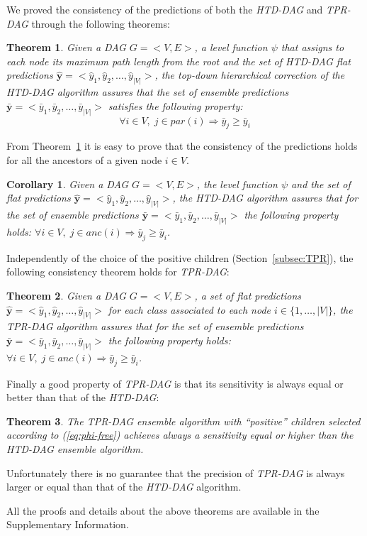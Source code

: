 \documentclass{bioinfo}
\newcommand{\by}{\boldsymbol{y}}
\newtheorem{theorem}{Theorem}
\newtheorem{corollary}{Corollary}
\begin{document}
\begin{methods}
We proved the consistency of the predictions of both the {\em HTD-DAG} and {\em TPR-DAG} through the following theorems:
\begin{theorem} 
Given a DAG $G = <V,E>$, a level function $\psi$ that assigns to each node its maximum path length from the root and the set of {\em HTD-DAG} flat predictions $\hat{\by} = < \hat{y}_1, \hat{y}_2, \ldots, \hat{y}_{|V|}>$, the top-down hierarchical correction of the {\em HTD-DAG} algorithm assures that the set of ensemble predictions $\bar{\by} =< \bar{y}_1, \bar{y}_2, \ldots, \bar{y}_{|V|}>$ satisfies the following property: 
\[
\forall i \in V, \;  j \in par(i) \Rightarrow \bar{y}_j \geq \bar{y}_i
\]
\label{th:htd}
\end{theorem}
From Theorem~\ref{th:htd} it is easy to prove that the consistency of the predictions holds for all the ancestors of a given node $i \in V$. 
\begin{corollary}\label{cor:hier-consistency} Given a DAG $G = <V,E>$, the level function $\psi$ and the set of flat predictions $\hat{\by} = < \hat{y}_1, \hat{y}_2, \ldots, \hat{y}_{|V|}>$,  the {\em HTD-DAG} algorithm assures that for the set of ensemble predictions $\bar{\by} = < \bar{y}_1, \bar{y}_2, \ldots, \bar{y}_{|V|}>$ the following property holds: $\forall i \in V, \;  j \in anc(i) \Rightarrow \bar{y}_j \geq \bar{y}_i$.
\end{corollary}
Independently of the choice of the positive children (Section~\ref{subsec:TPR}), the following consistency theorem holds for {\em TPR-DAG}:
\begin{theorem} Given a DAG $G = <V,E>$, a set of flat predictions $\hat{\by} = < \hat{y}_1, \hat{y}_2, \ldots, \hat{y}_{|V|}>$ for each class associated to each node $i \in \{1, \ldots, |V| \}$,  the {\em TPR-DAG} algorithm assures that for the set of ensemble predictions $\bar{\by} = < \bar{y}_1, \bar{y}_2, \ldots, \bar{y}_{|V|}>$ the following property holds: $\forall i \in V, \;  j \in anc(i) \Rightarrow \bar{y}_j \geq \bar{y}_i$.
\end{theorem}
Finally a good property of {\em TPR-DAG} is that its sensitivity is always equal or better than that of the {\em HTD-DAG}:
\begin{theorem}
The {\em TPR-DAG} ensemble algorithm with ``positive'' children selected according to (\ref{eq:phi-free}) achieves always a sensitivity equal or higher than the {\em HTD-DAG} ensemble algorithm.
\end{theorem}
Unfortunately there is no guarantee that the precision of {\em TPR-DAG} is always larger or equal than that of the {\em HTD-DAG} algorithm.

All the proofs and details about the above theorems are available in the Supplementary Information.

\end{methods}
\end{document}
